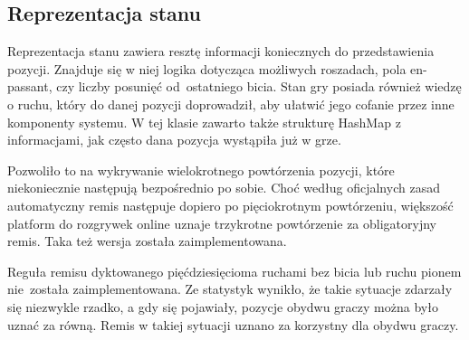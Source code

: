 \subsection{Reprezentacja stanu}
\label{subsec:reprezentacja-stanu}

Reprezentacja stanu zawiera resztę informacji koniecznych do przedstawienia pozycji.
Znajduje się w niej logika dotycząca możliwych roszadach, pola en-passant, czy liczby posunięć od~ostatniego bicia.
Stan gry posiada również wiedzę o ruchu, który do danej pozycji doprowadził, aby ułatwić jego cofanie przez inne komponenty systemu.
W tej klasie zawarto także strukturę HashMap z informacjami, jak często dana pozycja wystąpiła już w grze.

Pozwoliło to na wykrywanie wielokrotnego powtórzenia pozycji, które niekoniecznie następują bezpośrednio po sobie.
Choć według oficjalnych zasad automatyczny remis następuje dopiero po pięciokrotnym powtórzeniu, większość platform do rozgrywek online uznaje trzykrotne powtórzenie za obligatoryjny remis.
Taka też wersja została zaimplementowana.

Reguła remisu dyktowanego pięćdziesięcioma ruchami bez bicia lub ruchu pionem nie~została zaimplementowana.
Ze statystyk wynikło, że takie sytuacje zdarzały się niezwykle rzadko, a gdy się pojawiały, pozycje obydwu graczy można było uznać za równą.
Remis w takiej sytuacji uznano za korzystny dla obydwu graczy.




